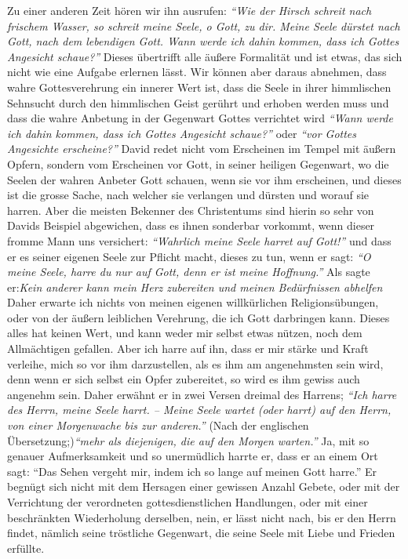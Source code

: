  Zu einer anderen Zeit hören wir ihn
ausrufen:
\textit{"`Wie der Hirsch schreit nach
frischem Wasser, so schreit meine Seele, o Gott, zu dir. Meine Seele dürstet
nach Gott, nach dem lebendigen Gott. Wann werde ich dahin kommen, dass ich
Gottes Angesicht schaue?"'}
Dieses übertrifft alle äußere
Formalität und ist etwas, das sich nicht wie eine
Aufgabe erlernen lässt. Wir
können aber daraus abnehmen, dass wahre Gottesverehrung ein innerer Wert ist,
dass die Seele in ihrer himmlischen Sehnsucht durch den himmlischen Geist
gerührt und erhoben werden muss und dass die wahre Anbetung in der Gegenwart
Gottes verrichtet wird
\textit{"`Wann werde ich dahin kommen, dass ich Gottes
Angesicht schaue?"'} oder \textit{"`vor Gottes Angesichte erscheine?"'} David
redet nicht
vom Erscheinen im Tempel mit äußern Opfern, sondern
vom Erscheinen vor Gott, in
seiner heiligen Gegenwart, wo die Seelen der wahren Anbeter Gott schauen, wenn
sie vor ihm erscheinen, und dieses ist die grosse Sache, nach welcher sie
verlangen und dürsten und worauf sie harren. Aber die meisten Bekenner des
Christentums sind hierin so sehr von Davids Beispiel abgewichen, dass es ihnen
sonderbar vorkommt, wenn dieser fromme Mann uns versichert:
\textit{"`Wahrlich meine Seele harret auf Gott!"'}
und dass er es seiner eigenen Seele zur Pflicht macht,
dieses zu tun, wenn er sagt:
\textit{"`O meine Seele, harre du nur auf Gott, denn er ist meine
Hoffnung."'}
Als sagte er:\textit{Kein anderer kann mein Herz
zubereiten und meinen Bedürfnissen abhelfen} Daher erwarte ich nichts von meinen
eigenen willkürlichen Religionsübungen,
oder von der äußern leiblichen
Verehrung, die ich Gott darbringen kann. Dieses alles hat keinen Wert, und kann
weder mir selbst etwas nützen, noch dem Allmächtigen gefallen. Aber ich
harre auf ihn, dass er mir stärke und Kraft verleihe, mich so vor ihm
darzustellen, als es ihm am angenehmsten sein wird, denn wenn er sich selbst ein
Opfer zubereitet, so wird es ihm gewiss auch angenehm
sein. Daher erwähnt er in
zwei Versen dreimal des Harrens;
\textit{"`Ich harre des Herrn, meine Seele harrt. --
Meine Seele wartet (oder harrt) auf den Herrn, von einer Morgenwache bis zur
anderen."'}
(Nach der englischen Übersetzung;)\textit{"`mehr als
diejenigen, die auf den Morgen warten."'} Ja, mit so genauer Aufmerksamkeit und
so unermüdlich harrte er, dass er an einem Ort sagt:
"`Das Sehen vergeht mir,
indem ich so lange auf meinen Gott harre."'
Er begnügt sich
nicht mit dem Hersagen einer gewissen Anzahl Gebete,
oder mit der Verrichtung
der verordneten gottesdienstlichen Handlungen, oder mit einer beschränkten
Wiederholung derselben, nein, er lässt nicht nach, bis er den Herrn findet,
nämlich seine tröstliche Gegenwart, die seine Seele mit Liebe und Frieden
erfüllte.

